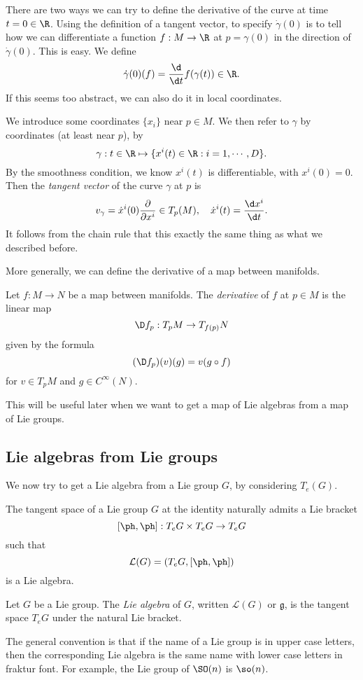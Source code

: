 \documentclass[a4paper]{article}
\begin{document}
There are two ways we can try to define the derivative of the curve at time $t = 0 \in \R$. Using the definition of a tangent vector, to specify $\dot{\gamma}(0)$ is to tell how we can differentiate a function $f: M \to \R$ at $p = \gamma(0)$ in the direction of $\dot{\gamma}(0)$. This is easy. We define
\[
  \dot{\gamma}(0)(f) = \frac{\d}{\d t} f(\gamma(t)) \in \R.
\]
If this seems too abstract, we can also do it in local coordinates.

We introduce some coordinates $\{x_i\}$ near $p \in M$. We then refer to $\gamma$ by coordinates (at least near $p$), by
\[
  \gamma: t \in \R \mapsto \{x^i(t) \in \R: i = 1, \cdots, D\}.
\]
By the smoothness condition, we know $x^i(t)$ is differentiable, with $x^i(0) = 0$. Then the \emph{tangent vector} of the curve $\gamma$ at $p$ is
\[
  v_\gamma = \dot{x}^i(0) \frac{\partial}{\partial x^i} \in T_p (M),\quad \dot{x}^i(t) = \frac{\d x^i}{\d t}.
\]
It follows from the chain rule that this exactly the same thing as what we described before.

More generally, we can define the derivative of a map between manifolds.
\begin{defi}[Derivative]
  Let $f: M \to N$ be a map between manifolds. The \emph{derivative} of $f$ at $p \in M$ is the linear map
  \[
    \D f_p: T_p M \to T_{f(p)} N
  \]
  given by the formula
  \[
    (\D f_p)(v)(g) = v(g \circ f)
  \]
  for $v \in T_p M$ and $g \in C^\infty(N)$.
\end{defi}
This will be useful later when we want to get a map of Lie algebras from a map of Lie groups.

\subsection{Lie algebras from Lie groups}
We now try to get a Lie algebra from a Lie group $G$, by considering $T_e(G)$.

\begin{thm}
  The tangent space of a Lie group $G$ at the identity naturally admits a Lie bracket
  \[
    [\ph, \ph]: T_e G \times T_e G \to T_e G
  \]
  such that
  \[
    \mathcal{L}(G) = (T_e G, [\ph, \ph])
  \]
  is a Lie algebra.
\end{thm}

\begin{defi}
  Let $G$ be a Lie group. The \emph{Lie algebra} of $G$, written $\mathcal{L}(G)$ or $\mathfrak{g}$, is the tangent space $T_e G$ under the natural Lie bracket.
\end{defi}
The general convention is that if the name of a Lie group is in upper case letters, then the corresponding Lie algebra is the same name with lower case letters in fraktur font. For example, the Lie group of $\SO(n)$ is $\so(n)$.
\end{document}

